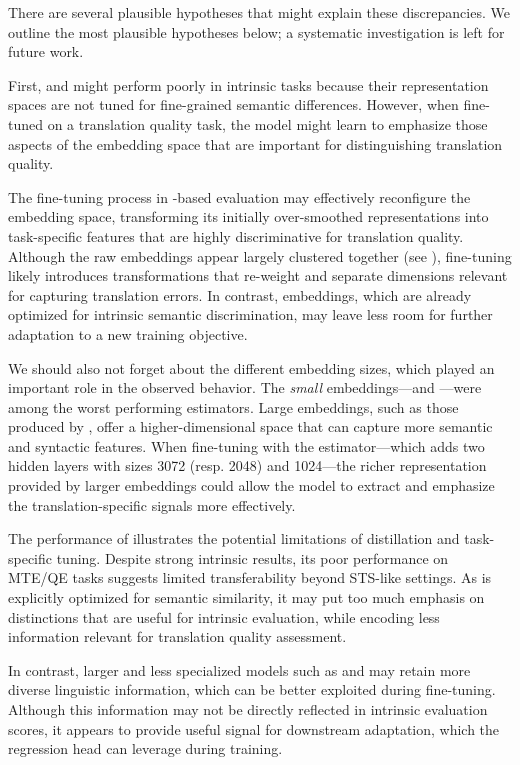 There are several plausible hypotheses that might explain these discrepancies. We outline the most plausible hypotheses below; a systematic investigation is left for future work.

First, \xlmr and \fernet might perform poorly in intrinsic tasks because their representation spaces are not tuned for fine-grained semantic differences. However, when fine-tuned on a translation quality task, the model might learn to emphasize those aspects of the embedding space that are important for distinguishing translation quality. 

The fine-tuning process in \comet-based evaluation may effectively reconfigure the \xlmr embedding space, transforming its initially over-smoothed representations into task-specific features that are highly discriminative for translation quality. Although the raw \xlmr embeddings appear largely clustered together (see ), fine-tuning likely introduces transformations that re-weight and separate dimensions relevant for capturing translation errors. In contrast, \simcse embeddings, which are already optimized for intrinsic semantic discrimination, may leave less room for further adaptation to a new training objective.

We should also not forget about the different embedding sizes, which played an important role in the observed behavior. The \emph{small} embeddings---\simcse and \retromae---were among the worst performing \comet estimators. Large embeddings, such as those produced by \xlmr, offer a higher-dimensional space that can capture more semantic and syntactic features. When fine-tuning with the \comet estimator---which adds two hidden layers with sizes 3072 (resp. 2048) and 1024---the richer representation provided by larger embeddings could allow the model to extract and emphasize the translation-specific signals more effectively. 

The performance of \simcse illustrates the potential limitations of distillation and task-specific tuning. Despite strong intrinsic results, its poor performance on MTE/QE tasks suggests limited transferability beyond STS-like settings. As \simcse is explicitly optimized for semantic similarity, it may put too much emphasis  on distinctions that are useful for intrinsic evaluation, while encoding less information relevant for translation quality assessment.

In contrast, larger and less specialized models such as \xlmr and \fernet may retain more diverse linguistic information, which can be better exploited during fine-tuning. Although this information may not be directly reflected in intrinsic evaluation scores, it appears to provide useful signal for downstream adaptation, which the \comet regression head can leverage during training.

